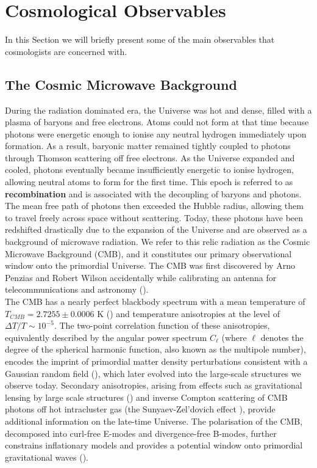 
\section{Cosmological Observables}

In this Section we will briefly present some of the main observables that cosmologists are concerned with. \\

\subsection{The Cosmic Microwave Background} \label{section:cmb}

During the radiation dominated era, the Universe was hot and dense, filled with a plasma of baryons and free electrons. Atoms could not form at that time because 
photons were energetic enough to ionise any neutral hydrogen immediately upon formation. As a result, baryonic matter remained tightly coupled to photons through 
Thomson scattering off free electrons. As the Universe expanded and cooled, photons eventually became insufficiently energetic to ionise hydrogen, allowing neutral atoms 
to form for the first time. This epoch is referred to as \textbf{recombination} and is associated with the decoupling of baryons and photons. The mean free path of 
photons then exceeded the Hubble radius, allowing them to travel freely across space without scattering. Today, these photons have been redshifted drastically due to the 
expansion of the Universe and are observed as a background of microwave radiation. We refer to this relic radiation as the Cosmic Microwave Background (CMB), and it 
constitutes our primary observational window onto the primordial Universe. The CMB was first discovered by Arno Penzias and Robert Wilson accidentally while calibrating 
an antenna for telecommunications and astronomy (\cite{Penzias_1965_a, Penzias_1965_b}). \\

The CMB has a nearly perfect blackbody spectrum with a mean temperature of $T_{CMB} = 2.7255 \pm 0.0006$ K (\cite{Fixsen_2009}) and temperature 
anisotropies at the level of $\Delta T / T \sim 10^{-5}$. The two-point correlation function of these anisotropies, equivalently described by the angular 
power spectrum $C_\ell$ (where $\ell$ denotes the degree of the spherical harmonic function, also known as the multipole number), 
encodes the imprint of primordial matter density perturbations consistent with a Gaussian random field (\cite{Planck_2018}), which later evolved 
into the large-scale structures we observe today. Secondary anisotropies, arising from effects such as gravitational lensing by large scale structures (\cite{Hu_2000}) and inverse Compton 
scattering of CMB photons off hot intracluster gas (the Sunyaev-Zel'dovich effect \cite{Sunyaev_1972}), provide additional information on the late-time Universe. The polarisation of the 
CMB, decomposed into curl-free E-modes and divergence-free B-modes, further constrains inflationary models and provides a potential window onto primordial gravitational waves (\cite{Kamionkowski_1997}).\\

